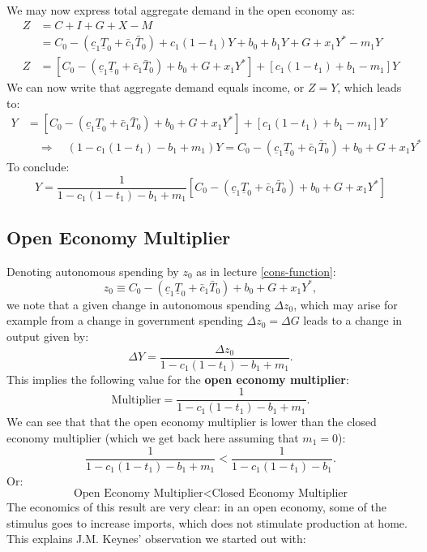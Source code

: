 \documentclass[]{book}
\theoremstyle{definition}
\theoremstyle{definition}
\theoremstyle{definition}
\theoremstyle{remark}
\begin{document}
We may now express total aggregate demand in the open economy as: \[
\begin{aligned}
Z &= C+I+G+X-M\\
&=C_0 -\left(\underline{c}_{1}\underline{T}_0+\bar{c}_{1}\bar{T}_0\right)+c_1 (1-t_1) Y + b_0 +b_1 Y+G+x_1 Y^{*} -m_1 Y\\
Z&=\left[ C_0 -\left(\underline{c}_{1}\underline{T}_0+\bar{c}_{1}\bar{T}_0\right)+ b_0 + G + x_1 Y^{*}\right]+\left[c_1 (1-t_1) + b_1 - m_1\right]Y
\end{aligned}
\] We can now write that aggregate demand equals income, or \(Z = Y\),
which leads to: \[
\begin{aligned}
Y &= \left[ C_0 -\left(\underline{c}_{1}\underline{T}_0+\bar{c}_{1}\bar{T}_0\right)+ b_0 + G + x_1 Y^{*}\right]+\left[c_1 (1-t_1) + b_1 - m_1\right]Y\\
&\quad \Rightarrow \quad (1-c_1(1-t_1)-b_1+m_1)Y = C_0 -\left(\underline{c}_{1}\underline{T}_0+\bar{c}_{1}\bar{T}_0\right)+ b_0 + G + x_1 Y^{*}
\end{aligned}
\] To conclude:
\[\boxed{Y = \frac{1}{1-c_1(1-t_1)-b_1+m_1} \left[C_0 -\left(\underline{c}_{1}\underline{T}_0+\bar{c}_{1}\bar{T}_0\right)+ b_0 + G + x_1 Y^{*}\right]}\]

\subsection{Open Economy Multiplier}\label{open-economy-multiplier}

Denoting autonomous spending by \(z_0\) as in lecture
\ref{cons-function}:
\[z_0 \equiv C_0 -\left(\underline{c}_{1}\underline{T}_0+\bar{c}_{1}\bar{T}_0\right)+ b_0 + G + x_1 Y^{*},\]
we note that a given change in autonomous spending \(\Delta z_0\), which
may arise for example from a change in government spending
\(\Delta z_0 = \Delta G\) leads to a change in output given by:
\[\Delta Y = \frac{\Delta z_0}{1-c_1(1-t_1)-b_1+m_1}.\] This implies the
following value for the \textbf{open economy multiplier}:
\[\boxed{\text{Multiplier} = \frac{1}{1-c_1(1-t_1)-b_1+m_1}}.\] We can
see that that the open economy multiplier is lower than the closed
economy multiplier (which we get back here assuming that \(m_1 = 0\)):
\[\frac{1}{1-c_1(1-t_1)-b_1+m_1}<\frac{1}{1-c_1(1-t_1)-b_1}.\] Or:
\[\boxed{\text{Open Economy Multiplier} < \text{Closed Economy Multiplier}}\]
The economics of this result are very clear: in an open economy, some of
the stimulus goes to increase imports, which does not stimulate
production at home. This explains J.M. Keynes' observation we started
out with:
\end{document}
